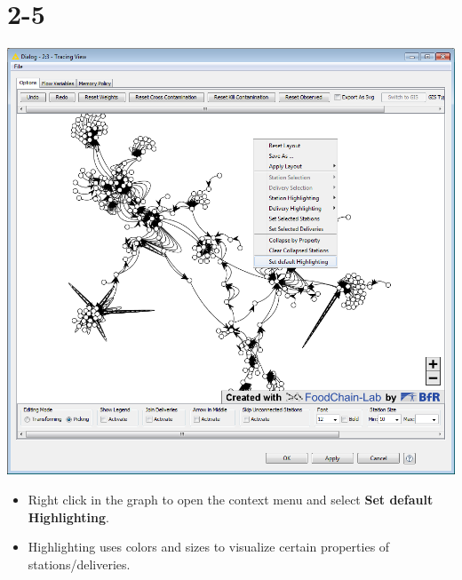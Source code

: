 \documentclass{beamer}
\begin{document}
\section{2-5}
\begin{frame}
	\begin{center}
  		\includegraphics[height=0.6\textheight]{2-5.png}
	\end{center}
	\begin{itemize}
		\item Right click in the graph to open the context menu and select \textbf{Set default Highlighting}.
		\item Highlighting uses colors and sizes to visualize certain properties of stations/deliveries.
	\end{itemize}
\end{frame}
\end{document}
